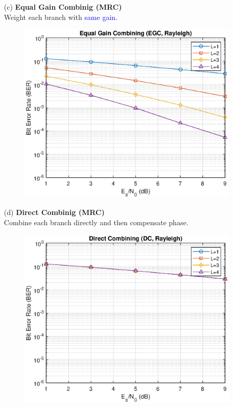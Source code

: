 \begin{itemize}
\begin{figure}[H]
    \end{figure}
    \item[(c)] \textbf{Equal Gain Combinig (MRC)} \hfill \\
    Weight each branch with \textcolor{blue}{same gain.}
    \begin{figure}[H]
        \centering
        \includegraphics[scale = 0.85]{EGC_rayleigh.eps}
    \end{figure}
    \item[(d)] \textbf{Direct Combinig (MRC)} \hfill \\
    Combine each branch directly and then compensate phase.
    \begin{figure}[H]
        \centering
        \includegraphics[scale = 0.85]{DC_rayleigh.eps}
    \end{figure}
\end{itemize}